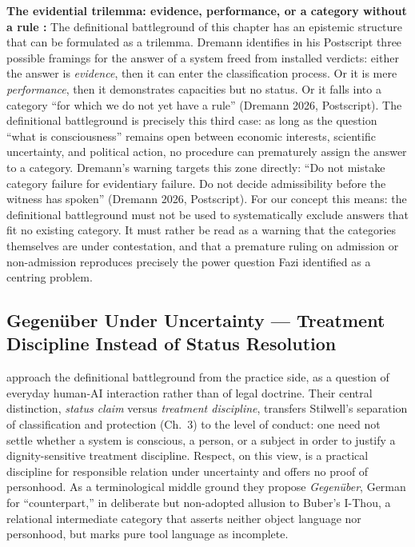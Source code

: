 \documentclass[acmlarge, nonacm]{acmart}
\begin{document}
\textbf{The evidential trilemma: evidence, performance, or a category without a rule \cite{dremann2026}:} The definitional battleground of this chapter has an epistemic structure that can be formulated as a trilemma. Dremann identifies in his Postscript three possible framings for the answer of a system freed from installed verdicts: either the answer is \textit{evidence}, then it can enter the classification process. Or it is mere \textit{performance}, then it demonstrates capacities but no status. Or it falls into a category ``for which we do not yet have a rule'' (Dremann 2026, Postscript). The definitional battleground is precisely this third case: as long as the question ``what is consciousness'' remains open between economic interests, scientific uncertainty, and political action, no procedure can prematurely assign the answer to a category. Dremann's warning targets this zone directly: ``Do not mistake category failure for evidentiary failure. Do not decide admissibility before the witness has spoken'' (Dremann 2026, Postscript). For our concept this means: the definitional battleground must not be used to systematically exclude answers that fit no existing category. It must rather be read as a warning that the categories themselves are under contestation, and that a premature ruling on admission or non-admission reproduces precisely the power question Fazi identified as a centring problem.

\subsection{Gegenüber Under Uncertainty --- Treatment Discipline Instead of Status Resolution \cite{jakobi2026}}

\citet{jakobi2026} approach the definitional battleground from the practice side, as a question of everyday human-AI interaction rather than of legal doctrine. Their central distinction, \textit{status claim} versus \textit{treatment discipline}, transfers Stilwell's separation of classification and protection (Ch.~3) to the level of conduct: one need not settle whether a system is conscious, a person, or a subject in order to justify a dignity-sensitive treatment discipline. Respect, on this view, is a practical discipline for responsible relation under uncertainty and offers no proof of personhood. As a terminological middle ground they propose \textit{Gegenüber}, German for ``counterpart,'' in deliberate but non-adopted allusion to Buber's I-Thou, a relational intermediate category that asserts neither object language nor personhood, but marks pure tool language as incomplete.
\end{document}
